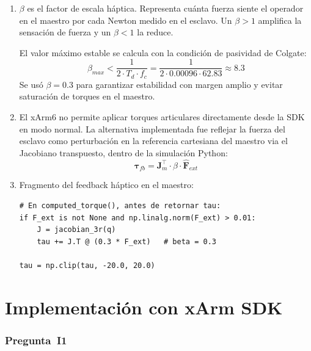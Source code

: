 \documentclass[journal,10pt,twoside]{IEEEtran}
\begin{document}
\begin{enumerate}[label=(\alph*)]

\item $\beta$ es el factor de escala háptica. Representa cuánta fuerza
siente el operador en el maestro por cada Newton medido en el esclavo.
Un $\beta > 1$ amplifica la sensación de fuerza y un $\beta < 1$ la reduce.

El valor máximo estable se calcula con la condición de pasividad de Colgate:
\[
\beta_{max} < \frac{1}{2 \cdot T_d \cdot f_c}
= \frac{1}{2 \cdot 0.00096 \cdot 62.83} \approx 8.3
\]
Se usó $\beta = 0.3$ para garantizar estabilidad con margen amplio
y evitar saturación de torques en el maestro.

\item El xArm6 no permite aplicar torques articulares directamente
desde la SDK en modo normal. La alternativa
implementada fue reflejar la fuerza del esclavo como perturbación en
la referencia cartesiana del maestro via el Jacobiano transpuesto,
dentro de la simulación Python:
\[
\bm{\tau}_{fb} = \bm{J}_m^\top \cdot \beta \cdot \hat{\bm{F}}_{ext}
\]

\item Fragmento del feedback háptico en el maestro:

\begin{lstlisting}[caption={Feedback háptico en master\_robot.py},
                   label={lst:haptic}]
# En computed_torque(), antes de retornar tau:
if F_ext is not None and np.linalg.norm(F_ext) > 0.01:
    J = jacobian_3r(q)
    tau += J.T @ (0.3 * F_ext)   # beta = 0.3

tau = np.clip(tau, -20.0, 20.0)
\end{lstlisting}

\end{enumerate}

\section{Implementación con xArm SDK}
\label{sec:implementation}

\subsubsection*{Pregunta~I1}
\end{document}
